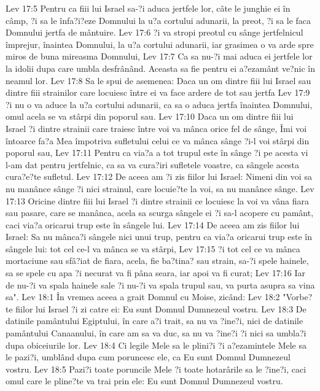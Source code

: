 Lev 17:5  Pentru ca fiii lui Israel sa-?i aduca jertfele lor, câte le junghie ei în câmp, ?i sa le înfa?i?eze Domnului la u?a cortului adunarii, la preot, ?i sa le faca Domnului jertfa de mântuire.
Lev 17:6  ?i va stropi preotul cu sânge jertfelnicul împrejur, înaintea Domnului, la u?a cortului adunarii, iar grasimea o va arde spre miros de buna mireasma Domnului,
Lev 17:7  Ca sa nu-?i mai aduca ei jertfele lor la idolii dupa care umbla desfrânând. Aceasta sa fie pentru ei a?ezamânt ve?nic în neamul lor.
Lev 17:8  Sa le spui de asemenea: Daca un om dintre fiii lui Israel sau dintre fiii strainilor care locuiesc între ei va face ardere de tot sau jertfa
Lev 17:9  ?i nu o va aduce la u?a cortului adunarii, ca sa o aduca jertfa înaintea Domnului, omul acela se va stârpi din poporul sau.
Lev 17:10  Daca un om dintre fiii lui Israel ?i dintre strainii care traiesc între voi va mânca orice fel de sânge, Îmi voi întoarce fa?a Mea împotriva sufletului celui ce va mânca sânge ?i-l voi stârpi din poporul sau,
Lev 17:11  Pentru ca via?a a tot trupul este în sânge ?i pe acesta vi l-am dat pentru jertfelnic, ca sa va cura?iri sufletele voastre, ca sângele acesta cura?e?te sufletul.
Lev 17:12  De aceea am ?i zis fiilor lui Israel: Nimeni din voi sa nu manânce sânge ?i nici strainul, care locuie?te la voi, sa nu manânce sânge.
Lev 17:13  Oricine dintre fiii lui Israel ?i dintre strainii ce locuiesc la voi va vâna fiara sau pasare, care se manânca, acela sa scurga sângele ei ?i sa-l acopere cu pamânt, caci via?a oricarui trup este în sângele lui.
Lev 17:14  De aceea am zis fiilor lui Israel: Sa nu mânca?i sângele nici unui trup, pentru ca via?a oricarui trup este în sângele lui: tot cel ce-l va mânca se va stârpi,
Lev 17:15  ?i tot cel ce va mânca mortaciune sau sfâ?iat de fiara, acela, fie ba?tina? sau strain, sa-?i spele hainele, sa se spele cu apa ?i necurat va fi pâna seara, iar apoi va fi curat;
Lev 17:16  Iar de nu-?i va spala hainele sale ?i nu-?i va spala trupul sau, va purta asupra sa vina sa".
Lev 18:1  În vremea aceea a grait Domnul cu Moise, zicând:
Lev 18:2  "Vorbe?te fiilor lui Israel ?i zi catre ei: Eu sunt Domnul Dumnezeul vostru.
Lev 18:3  De datinile pamântului Egiptului, în care a?i trait, sa nu va ?ine?i, nici de datinile pamântului Canaanului, în care am sa va duc, sa nu va ?ine?i ?i nici sa umbla?i dupa obiceiurile lor.
Lev 18:4  Ci legile Mele sa le plini?i ?i a?ezamintele Mele sa le pazi?i, umblând dupa cum poruncesc ele, ca Eu sunt Domnul Dumnezeul vostru.
Lev 18:5  Pazi?i toate poruncile Mele ?i toate hotarârile sa le ?ine?i, caci omul care le pline?te va trai prin ele: Eu sunt Domnul Dumnezeul vostru.
